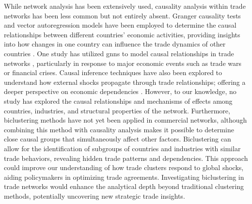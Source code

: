 \documentclass[preprint, 3p,
authoryear]{elsarticle} %
\begin{document}
While network analysis has been extensively used, causality analysis
within trade networks has been less common but not entirely absent.
Granger causality tests and vector autoregression models have been
employed to determine the causal relationships between different
countries' economic activities, providing insights into how changes in
one country can influence the trade dynamics of other countries
\citep{Saimul2020}. One study has utilized \glspl{gnn} to model causal
relationships in trade networks \citep{monken2021graph}, particularly in
response to major economic events such as trade wars or financial
crises. Causal inference techniques have also been explored to
understand how external shocks propagate through trade relationships;
offering a deeper perspective on economic dependencies
\citep{rigena2021}. However, to our knowledge, no study has explored the
causal relationships and mechanisms of effects among countries,
industries, and structural properties of the network. Furthermore,
biclustering methods have not yet been applied in commercial networks,
although combining this method with causality analysis makes it possible
to determine close causal groups that simultaneously affect other
factors. Biclustering \citep{g2024comprehensive} can allow for the
identification of subgroups of countries and industries with similar
trade behaviors, revealing hidden trade patterns and dependencies. This
approach could improve our understanding of how trade clusters respond
to global shocks, aiding policymakers in optimizing trade agreements.
Investigating biclustering in trade networks would enhance the
analytical depth beyond traditional clustering methods, potentially
uncovering new strategic trade insights.
\end{document}

